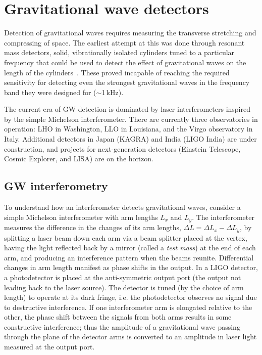 \chapter{Gravitational wave detectors}\label{ch:detectors}

Detection of gravitational waves requires measuring the transverse stretching and compressing of space. The earliest attempt at this was done through resonant mass detectors, solid, vibrationally isolated cylinders tuned to a particular frequency that could be used to detect the effect of gravitational waves on the length of the cylinders~\citep{Weber_1968}. These proved incapable of reaching the required sensitivity for detecting even the strongest gravitational waves in the frequency band they were designed for ($\sim$1\,kHz).

The current era of \ac{GW} detection is dominated by laser interferometers inspired by the simple Michelson interferometer. There are currently three observatories in operation: \ac{LHO} in Washington, \ac{LLO} in Louisiana, and the Virgo observatory in Italy. Additional detectors in Japan (KAGRA) and India (LIGO India) are under construction, and projects for next-generation detectors (Einstein Telescope, Cosmic Explorer, and \ac{LISA}) are on the horizon.


\section{GW interferometry}


To understand how an interferometer detects gravitational waves, consider a simple Michelson interferometer with arm lengths $L_x$ and $L_y$.
The interferometer measures the difference in the changes of its arm lengths, $\Delta L = \Delta L_x - \Delta L_y$, by splitting a laser beam down each arm via a beam splitter placed at the vertex, having the light reflected back by a mirror (called a \textit{test mass}) at the end of each arm, and producing an interference pattern when the beams reunite.
Differential changes in arm length manifest as phase shifts in the output.
In a LIGO detector, a photodetector is placed at the anti-symmetric output port (the output not leading back to the laser source).
The detector is tuned (by the choice of arm length) to operate at its dark fringe, i.e. the photodetector observes no signal due to destructive interference.
If one interferometer arm is elongated relative to the other, the phase shift between the signals from both arms results in some constructive interference; thus the amplitude of a gravitational wave passing through the plane of the detector arms is converted to an amplitude in laser light measured at the output port.

